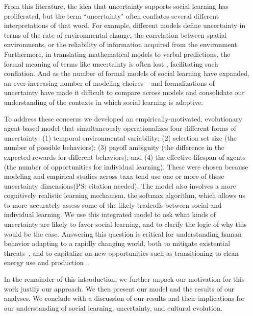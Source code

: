 \documentclass[letterpaper,11.5pt]{scrartcl}
\newcommand{\ps}[1]{{\textcolor{mygreen} {({\tiny PS:} #1)}}}
\begin{document}
From this literature, the idea that uncertainty supports social learning has proliferated, but the term ``uncertainty" often conflates several different interpretations of that word. For example, different models define uncertainty in terms of the rate of environmental change, the correlation between spatial environments, or the reliability of information acquired from the environment. 
Furthermore, in translating mathematical models to verbal predictions, the formal meaning of terms like uncertainty is often lost \cite{lawson1988probability}, facilitating such conflation. 
And as the number of formal models of social learning have expanded, an ever increasing number
of modeling choices ~\cite[Figure 1]{Kendal2018} and formalizations of uncertainty have made it difficult to compare across models and consolidate our understanding of the contexts in which social learning is adaptive.  

To address these concerns we developed an empirically-motivated, evolutionary agent-based model that simultaneously operationalizes four %
different forms of uncertainty: (1) temporal environmental variability; (2) selection set size (the number of possible behaviors); (3) payoff ambiguity (the difference in the expected rewards for different behaviors); and (4) the effective lifespan of agents (the number of opportunities for individual learning). These were chosen because modeling and empirical 
studies across taxa tend use one or more of these uncertainty dimensions\ps{citation needed}.  
The model also involves a more cognitively realistic learning mechanism, the softmax algorithm, which allows us to more accurately assess some of the likely tradeoffs between social and individual learning. We use this integrated model to ask what kinds of uncertainty are likely to favor social learning, and to clarify the logic of why this would be the case. Answering this question is critical for understanding human behavior adapting to a rapidly changing world, both to mitigate existential threats~\cite{Moya2020,Jones2021}, and to capitalize on new opportunities such as transitioning to clean energy use and production~\cite{NatureEnergyEditorialPromisesPremises2018,Brisbois2022}.

In the remainder of this introduction, we further unpack our motivation for this work justify our approach. We then present our model and the results of our analyses. We conclude with a discussion of our results and their implications for our understanding of social learning, uncertainty, and cultural evolution. 
\end{document}
